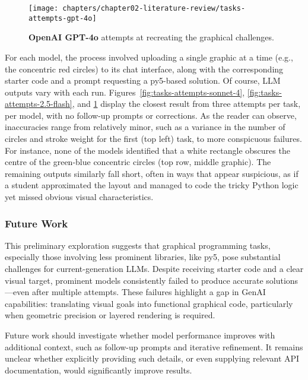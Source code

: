 \begin{figure}[H]%
\centering
\texttt{[image: chapters/chapter02-literature-review/tasks-attempts-gpt-4o]}
\captionsetup{width=0.8\textwidth}
\caption{\textbf{OpenAI GPT-4o} attempts at recreating the graphical challenges.}
\label{fig:tasks-attempts-gpt-4o}
\end{figure}

For each model, the process involved uploading a single graphic at a time (e.g., the concentric red circles) to its chat interface, along with the corresponding starter code and a prompt requesting a py5-based solution. Of course, LLM outputs vary with each run. Figures~\ref{fig:tasks-attempts-sonnet-4}, \ref{fig:tasks-attempts-2.5-flash}, and \ref{fig:tasks-attempts-gpt-4o} display the closest result from three attempts per task, per model, with no follow-up prompts or corrections. As the reader can observe, inaccuracies range from relatively minor, such as a variance in the number of circles and stroke weight for the first (top left) task, to more conspicuous failures. For instance, none of the models identified that a white rectangle obscures the centre of the green-blue concentric circles (top row, middle graphic). The remaining outputs similarly fall short, often in ways that appear suspicious, as if a student approximated the layout and managed to code the tricky Python logic yet missed obvious visual characteristics.

\subsubsection{Future Work}

This preliminary exploration suggests that graphical programming tasks, especially those involving less prominent libraries, like py5, pose substantial challenges for current-generation LLMs. Despite receiving starter code and a clear visual target, prominent models consistently failed to produce accurate solutions---even after multiple attempts. These failures highlight a gap in GenAI capabilities: translating visual goals into functional graphical code, particularly when geometric precision or layered rendering is required.

Future work should investigate whether model performance improves with additional context, such as follow-up prompts and iterative refinement. It remains unclear whether explicitly providing such details, or even supplying relevant API documentation, would significantly improve results.

